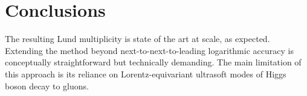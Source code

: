 \section{Conclusions}\label{sec:conclusions}

The resulting Lund multiplicity is state of the art at scale, as
expected. Extending the method beyond next-to-next-to-leading
logarithmic accuracy is conceptually straightforward but technically
demanding. The main limitation of this approach is its reliance on
Lorentz-equivariant ultrasoft modes of Higgs boson decay to gluons.

